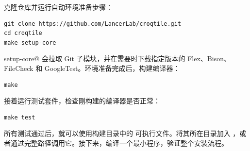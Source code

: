 克隆仓库并运行自动环境准备步骤：

\begin{lstlisting}[language=croqtile,caption={克隆仓库并准备依赖}]
git clone https://github.com/LancerLab/croqtile.git
cd croqtile
make setup-core
\end{lstlisting}

\co@make setup-core@ 会拉取 Git 子模块，并在需要时下载指定版本的 Flex、Bison、FileCheck 和 GoogleTest。环境准备完成后，构建编译器：

\begin{lstlisting}[language=croqtile,caption={构建编译器}]
make
\end{lstlisting}

接着运行测试套件，检查刚构建的编译器是否正常：

\begin{lstlisting}[language=croqtile,caption={运行测试套件}]
make test
\end{lstlisting}

所有测试通过后，就可以使用构建目录中的 \co@croq@ 可执行文件。将其所在目录加入 \co@PATH@，或者通过完整路径调用它。接下来，编译一个最小程序，验证整个安装流程。

